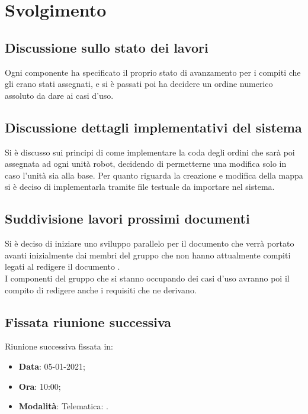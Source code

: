 \documentclass[]{article}
\begin{document}
	\newpage

	\section{Svolgimento}
		\subsection{Discussione sullo stato dei lavori}
        Ogni componente ha specificato il proprio stato di avanzamento per i compiti che gli erano stati assegnati, e si è passati poi ha decidere un ordine numerico assoluto da dare ai casi d'uso.\\

        \subsection{Discussione dettagli implementativi del sistema}
        Si è discusso sui principi di come implementare la coda degli ordini che sarà poi assegnata ad ogni unità robot, decidendo di permetterne una modifica solo in caso l'unità sia alla base. Per quanto riguarda la creazione e modifica della mappa si è deciso di implementarla tramite file testuale da importare nel sistema.\\
        
        \subsection{Suddivisione lavori prossimi documenti}
        Si è deciso di iniziare uno sviluppo parallelo per il documento  che verrà portato avanti inizialmente dai membri del gruppo che non hanno attualmente compiti legati al redigere il documento . \\
        I componenti del gruppo che si stanno occupando dei casi d'uso avranno poi il compito di redigere anche i requisiti che ne derivano.\\

		\subsection{Fissata riunione successiva}
		Riunione successiva fissata in:
		\begin{itemize}
			\item \textbf{Data}: 05-01-2021;
			\item \textbf{Ora}: 10:00;
			\item \textbf{Modalità}: Telematica: .
		\end{itemize}
\end{document}
